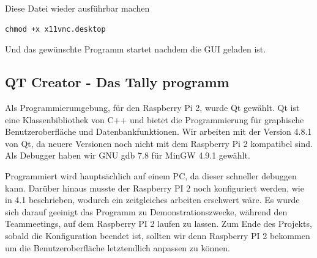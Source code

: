 \documentclass[11pt,a4paper]{article} %
\begin{document}
Diese Datei wieder ausf\"uhrbar machen
\begin{frame}

\begin{lstlisting}
chmod +x x11vnc.desktop
\end{lstlisting}
\end{frame}
Und das gew\"unschte Programm startet nachdem die GUI geladen ist.



\subsection{QT Creator - Das Tally programm}
Als Programmierumgebung, für den Raspberry Pi 2, wurde Qt gewählt.
Qt ist eine Klassenbibliothek von C++ und bietet die Programmierung für  graphische Benutzeroberfläche und Datenbankfunktionen.
Wir arbeiten mit der Version 4.8.1 von Qt, da neuere Versionen noch nicht mit dem Raspberry Pi 2 kompatibel sind.
Als Debugger haben wir GNU gdb 7.8 für MinGW 4.9.1 gewählt.
\par
Programmiert wird hauptsächlich auf einem PC, da dieser schneller debuggen kann.
Darüber hinaus musste der Raspberry PI 2 noch konfiguriert werden, wie in 4.1 beschrieben, wodurch ein zeitgleiches arbeiten erschwert wäre.
Es wurde sich darauf geeinigt das Programm zu Demonstrationszwecke, während den Teammeetings, auf dem Raspberry PI 2 laufen zu lassen.
Zum Ende des Projekts, sobald die Konfiguration beendet ist, sollten wir denn Raspberry PI 2 bekommen um die Benutzeroberfläche letztendlich anpassen zu können.
\par
\end{document}
